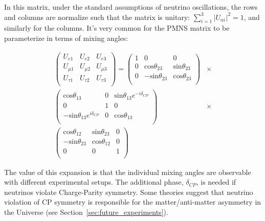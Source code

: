 In this matrix, under the standard assumptions of neutrino oscillations, the rows and columns are normalize such that the matrix is  unitary: $\sum_{i=1}^3 | U_{\alpha i} | ^2 = 1$, and similarly for the columns.  It's very common for the PMNS matrix to be parameterize in terms of mixing angles: 

\begin{align*}
  \left(
  \begin{array}{ccc}
    U_{e1} & U_{e2} & U_{e3}  \\
    U_{\mu1} & U_{\mu2} & U_{\mu3}  \\
    U_{\tau1} & U_{\tau2} & U_{\tau3}  \\
  \end{array} 
  \right)
  = 
  \left(
  \begin{array}{ccc}
    1 & 0 & 0  \\
    0 & \text{cos}\theta_{23} & \text{sin}\theta_{23}  \\
    0 & -\text{sin}\theta_{23} & \text{cos}\theta_{23}  \\
  \end{array} 
  \right)
  &\times \\
  \left(
  \begin{array}{ccc}
     \text{cos}\theta_{13} & 0 & \text{sin}\theta_{13} e^{ - i \delta_{CP}}  \\
     0 & 1 & 0  \\
     -\text{sin}\theta_{13} e^{i \delta_{CP}} & 0 & \text{cos}\theta_{13}  \\
  \end{array} 
  \right)
  &\times \\
  \left(
  \begin{array}{ccc}
    \text{cos}\theta_{12} & \text{sin}\theta_{23} & 0  \\
    - \text{sin}\theta_{23} & \text{cos}\theta_{12} & 0 \\
    0 & 0 & 1  \\
  \end{array} 
  \right)
\end{align*}

The value of this expansion is that the individual mixing angles are observable with different experimental setups.  The additional phase, $\delta_{CP}$, is needed if neutrinos violate Charge-Parity symmetry.  Some theories suggest that neutrino violation of CP symmetry is responsible for the matter/anti-matter asymmetry in the Universe (see Section~\ref{sec:future_experiments}).


